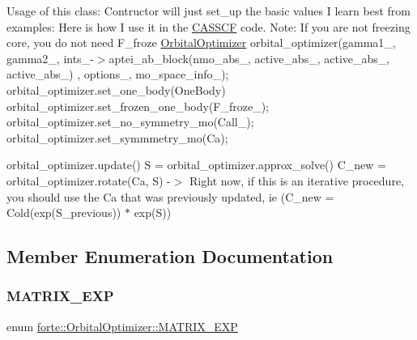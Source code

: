 Usage of this class\+: Contructor will just set\+\_\+up the basic values I learn best from examples\+: Here is how I use it in the \mbox{\hyperlink{classforte_1_1_c_a_s_s_c_f}{C\+A\+S\+S\+CF}} code. Note\+: If you are not freezing core, you do not need F\+\_\+froze \mbox{\hyperlink{classforte_1_1_orbital_optimizer}{Orbital\+Optimizer}} orbital\+\_\+optimizer(gamma1\+\_\+, gamma2\+\_\+, ints\+\_\+-\/$>$aptei\+\_\+ab\+\_\+block(nmo\+\_\+abs\+\_\+, active\+\_\+abs\+\_\+, active\+\_\+abs\+\_\+, active\+\_\+abs\+\_\+) , options\+\_\+, mo\+\_\+space\+\_\+info\+\_\+); orbital\+\_\+optimizer.\+set\+\_\+one\+\_\+body(\+One\+Body) orbital\+\_\+optimizer.\+set\+\_\+frozen\+\_\+one\+\_\+body(\+F\+\_\+froze\+\_\+); orbital\+\_\+optimizer.\+set\+\_\+no\+\_\+symmetry\+\_\+mo(\+Call\+\_\+); orbital\+\_\+optimizer.\+set\+\_\+symmmetry\+\_\+mo(\+Ca);

orbital\+\_\+optimizer.\+update() S = orbital\+\_\+optimizer.\+approx\+\_\+solve() C\+\_\+new = orbital\+\_\+optimizer.\+rotate(\+Ca, S) -\/$>$ Right now, if this is an iterative procedure, you should use the Ca that was previously updated, ie (C\+\_\+new = Cold(exp(\+S\+\_\+previous)) $\ast$ exp(\+S)) 

\subsection{Member Enumeration Documentation}
\mbox{\label{classforte_1_1_orbital_optimizer_a980c6c26da8235026de349b1b11ccc02}} 
\subsubsection{\texorpdfstring{M\+A\+T\+R\+I\+X\+\_\+\+E\+XP}{MATRIX\_EXP}}
{\footnotesize\ttfamily enum \mbox{\hyperlink{classforte_1_1_orbital_optimizer_a980c6c26da8235026de349b1b11ccc02}{forte\+::\+Orbital\+Optimizer\+::\+M\+A\+T\+R\+I\+X\+\_\+\+E\+XP}}\hspace{0.3cm}{\ttfamily [protected]}}

